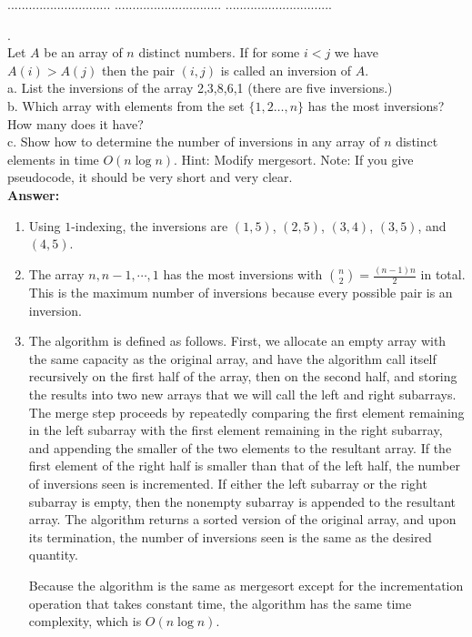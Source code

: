 \documentclass[a4paper,11pt]{article}
\begin{document}
\pagebreak
{} $.............................$
 $..............................$
          $..............................$\\

\bigskip

.\\
Let $A$ be an array of $n$ distinct numbers. If  for some $i < j$  we have $A(i)>A(j)$ 
then the pair $(i,j)$ is called an inversion of $A$. \\
a. List the  inversions of the array 2,3,8,6,1 (there are five inversions.)\\
b. Which array with elements from the set $\{1, 2 \ldots , n \}$ has the most inversions? How many does it have?\\
c. Show how to determine the number of inversions in any array of $n$ distinct elements in time $O(n \log n)$. Hint: Modify mergesort.
Note: If you give pseudocode, it should be very short and very clear.\\
{\bf Answer:}\\
\begin{enumerate}[label=\alph*.]
    \item
        Using $1$-indexing, the inversions are $(1, 5)$, $(2, 5)$, $(3, 4)$, $(3, 5)$, and $(4, 5)$.

    \item
        The array $n, n - 1, \cdots, 1$ has the most inversions with $\binom{n}{2} = \frac{(n - 1)n}{2}$ in total. This is the maximum number of inversions because every possible pair is an inversion.

    \item
        The algorithm is defined as follows. First, we allocate an empty array with the same capacity as the original array, and have the algorithm call itself recursively on the first half of the array, then on the second half, and storing the results into two new arrays that we will call the left and right subarrays. The merge step proceeds by repeatedly comparing the first element remaining in the left subarray with the first element remaining in the right subarray, and appending the smaller of the two elements to the resultant array. If the first element of the right half is smaller than that of the left half, the number of inversions seen is incremented. If either the left subarray or the right subarray is empty, then the nonempty subarray is appended to the resultant array. The algorithm returns a sorted version of the original array, and upon its termination, the number of inversions seen is the same as the desired quantity. \par
        Because the algorithm is the same as mergesort except for the incrementation operation that takes constant time, the algorithm has the same time complexity, which is $O(n \log n)$.
\end{enumerate}
\end{document}
